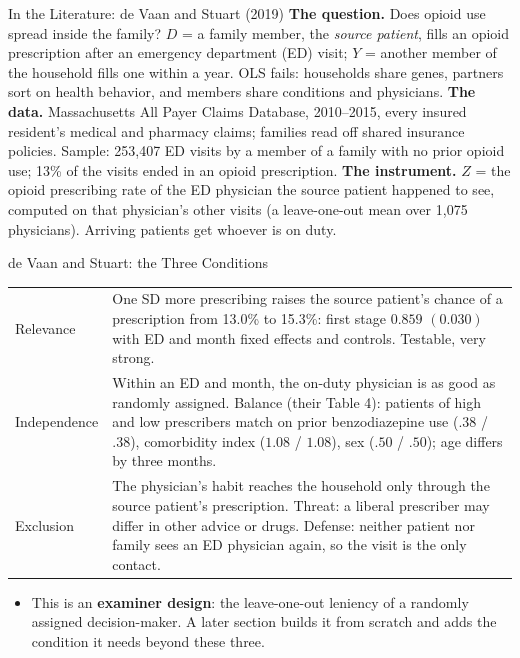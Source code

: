 \documentclass[aspectratio=169,11pt,xcolor=dvipsnames]{beamer}
\begin{document}
\begin{frame}{In the Literature: de Vaan and Stuart (2019)}
\textbf{The question.} Does opioid use spread inside the family? $D$ = a
family member, the \emph{source patient}, fills an opioid prescription after an
emergency department (ED) visit; $Y$ = another member of the household fills
one within a year. OLS fails: households share genes, partners sort on health
behavior, and members share conditions and physicians.
\vskip3pt
\textbf{The data.} Massachusetts All Payer Claims Database, 2010--2015, every
insured resident's medical and pharmacy claims; families read off shared
insurance policies. Sample: 253,407 ED visits by a member of a family with no
prior opioid use; 13\% of the visits ended in an opioid prescription.
\vskip3pt
\textbf{The instrument.} $Z$ = the opioid prescribing rate of the ED physician
the source patient happened to see, computed on that physician's other visits
(a leave-one-out mean over 1,075 physicians). Arriving patients get whoever is
on duty.
\end{frame}

\begin{frame}{de Vaan and Stuart: the Three Conditions}
\begin{center}\footnotesize
\renewcommand{\arraystretch}{1.15}
\begin{tabular}{@{}lp{10.6cm}@{}}
\toprule
Relevance & One SD more prescribing raises the source patient's chance of a
  prescription from 13.0\% to 15.3\%: first stage $0.859$ $(0.030)$ with ED and
  month fixed effects and controls. \alert{Testable, very strong.} \\
Independence & Within an ED and month, the on-duty physician is as good as
  randomly assigned. Balance (their Table 4): patients of high and low
  prescribers match on prior benzodiazepine use ($.38$ / $.38$), comorbidity
  index ($1.08$ / $1.08$), sex ($.50$ / $.50$); age differs by three months. \\
Exclusion & The physician's habit reaches the household only through the
  source patient's prescription. Threat: a liberal prescriber may differ in
  other advice or drugs. Defense: neither patient nor family sees an ED
  physician again, so the visit is the only contact. \\
\bottomrule
\end{tabular}
\end{center}
\vskip2pt
\begin{itemize}\itemsep2pt
  \item This is an \textbf{examiner design}: the leave-one-out leniency of a
        randomly assigned decision-maker. A later section builds it from
        scratch and adds the condition it needs beyond these three.
\end{itemize}
\end{frame}
\end{document}

